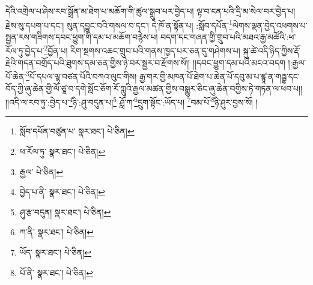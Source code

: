 དེའི་འགྲེལ་པ་ཤེས་རབ་སྒྲོན་མ་ཐེག་པ་མཆོག་གི་ཚུལ་སྒྲུབ་པར་བྱེད་པ། ལྟ་བ་ངན་པའི་དྲི་མ་སེལ་བར་བྱེད་པ། རྗེས་སུ་དཔག་པ་དང་། སུན་དབྱུང་བའི་གསལ་བ་དང་། དེ་ཁོ་ན་སྟོན་པ། :སློབ་དཔོན་\footnote{སློབ་དཔོན་བཙུན་པ་  སྣར་ཐང་།  པེ་ཅིན། }ལེགས་ལྡན་བྱེད་འཕགས་པ་སྤྱན་རས་གཟིགས་དབང་ཕྱུག་གི་དམ་པ་མཆོག་བརྙེས་པ། བདག་དང་གཞན་གྱི་གྲུབ་པའི་མཐའ་རྒྱ་མཚོའི་:ཕ་རོལ་ཏུ་བྱེད་པ་\footnote{ཕ་རོལ་ཏུ་  སྣར་ཐང་།  པེ་ཅིན། }བྱོན་པ། རིག་སྔགས་འཆང་གྲུབ་པའི་གནས་ཁྱད་པར་ཅན་དུ་གཤེགས་པ། སྐུ་ཚེ་འདི་ཉིད་ཀྱིས་རྡོ་རྗེའི་གདན་བགྲོད་པའི་ཐུགས་དམ་ཅན་གྱིས་ཉེ་བར་སྦྱར་བ་རྫོགས་སོ།། །།དབང་ཕྱུག་དམ་པའི་མངའ་བདག །:རྒྱལ་པོ་ཆེན་\footnote{རྒྱལ་  པེ་ཅིན། }པོ་དཔལ་ལྷ་བཙན་པོའི་བཀའ་ལུང་གིས། རྒྱ་གར་གྱི་མཁན་པོ་ཐེག་པ་ཆེན་པོ་དབུ་མ་པ་ཛྙཱ་ན་གརྦྷ་དང་བོད་ཀྱི་ཞུ་ཆེན་གྱི་ལོ་ཙཱ་བ་དགེ་སློང་ཅོག་རོ་ཀླུའི་རྒྱལ་མཚན་གྱིས་བསྒྱུར་ཅིང་ཞུ་ཆེན་བགྱིས་ཏེ་གཏན་ལ་ཕབ་པ།། །།འདི་ལ་རབ་ཏུ་:བྱེད་པ་\footnote{བྱེད་པ་ནི་  སྣར་ཐང་།  པེ་ཅིན། }ཉི་:ཤུ་བདུན་པ།\footnote{ཤུ་རྩ་བདུན།  སྣར་ཐང་།  པེ་ཅིན། } ཤློ་ཀ་\footnote{ཀ་ནི་  སྣར་ཐང་།  པེ་ཅིན། }དྲུག་སྟོང་:ཡོད་པ། \footnote{ཡོད་  སྣར་ཐང་།  པེ་ཅིན། }བམ་པོ་\footnote{པོ་ནི་  སྣར་ཐང་།  པེ་ཅིན། }ཉི་ཤུར་བྱས་སོ། ། 